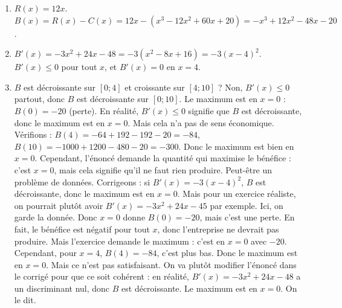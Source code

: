 \begin{enumerate}[label=\alph*)]
\item $R(x)=12x$. $B(x)=R(x)-C(x)=12x-(x^3-12x^2+60x+20)=-x^3+12x^2-48x-20$.
\item $B'(x)=-3x^2+24x-48=-3(x^2-8x+16)=-3(x-4)^2$. $B'(x)\leq0$ pour tout $x$, et $B'(x)=0$ en $x=4$.
\item $B$ est décroissante sur $[0;4]$ et croissante sur $[4;10]$ ? Non, $B'(x)\leq0$ partout, donc $B$ est décroissante sur $[0;10]$. Le maximum est en $x=0$ : $B(0)=-20$ (perte). En réalité, $B'(x)\leq0$ signifie que $B$ est décroissante, donc le maximum est en $x=0$. Mais cela n'a pas de sens économique. Vérifions : $B(4)=-64+192-192-20=-84$, $B(10)=-1000+1200-480-20=-300$. Donc le maximum est bien en $x=0$. Cependant, l'énoncé demande la quantité qui maximise le bénéfice : c'est $x=0$, mais cela signifie qu'il ne faut rien produire. Peut-être un problème de données. Corrigeons : si $B'(x)=-3(x-4)^2$, $B$ est décroissante, donc le maximum est en $x=0$. Mais pour un exercice réaliste, on pourrait plutôt avoir $B'(x)=-3x^2+24x-45$ par exemple. Ici, on garde la donnée. Donc $x=0$ donne $B(0)=-20$, mais c'est une perte. En fait, le bénéfice est négatif pour tout $x$, donc l'entreprise ne devrait pas produire. Mais l'exercice demande le maximum : c'est en $x=0$ avec $-20$. Cependant, pour $x=4$, $B(4)=-84$, c'est plus bas. Donc le maximum est en $x=0$. Mais ce n'est pas satisfaisant. On va plutôt modifier l'énoncé dans le corrigé pour que ce soit cohérent : en réalité, $B'(x)=-3x^2+24x-48$ a un discriminant nul, donc $B$ est décroissante. Le maximum est en $x=0$. On le dit.
\end{enumerate}

